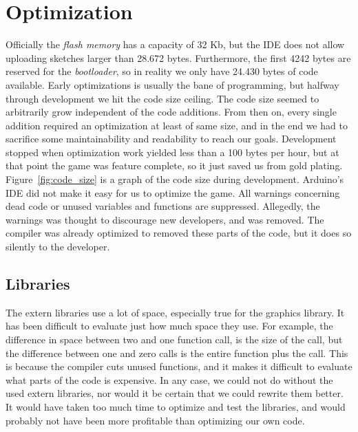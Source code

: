 \section{Optimization} %
Officially the \emph{flash memory} has a capacity of 32 Kb, but the IDE does not allow uploading sketches larger than 28.672 bytes. Furthermore, the first 4242 bytes are reserved for the \emph{bootloader}, so in reality we only have 24.430 bytes of code available. %
\newline
Early optimizations is usually the bane of programming, but halfway through development we hit the code size ceiling. The code size seemed to arbitrarily grow independent of the code additions. From then on, every single addition required an optimization at least of same size, and in the end we had to sacrifice some maintainability and readability to reach our goals. Development stopped when optimization work yielded less than a 100 bytes per hour, but at that point the game was feature complete, so it just saved us from gold plating. Figure~\ref{fig:code_size} is a graph of the code size during development.
\newline
Arduino's IDE did not make it easy for us to optimize the game. All warnings concerning dead code or unused variables and functions are suppressed. Allegedly, the warnings was thought to discourage new developers, and was removed. The compiler was already optimized to removed these parts of the code, but it does so silently to the developer.

\subsection{Libraries} %
The extern libraries use a lot of space, especially true for the graphics library. It has been difficult to evaluate just how much space they use. For example, the difference in space between two and one function call, is the size of the call, but the difference between one and zero calls is the entire function plus the call. This is because the compiler cuts unused functions, and it makes it difficult to evaluate what parts of the code is expensive.
\newline
In any case, we could not do without the used extern libraries, nor would it be certain that we could rewrite them better. It would have taken too much time to optimize and test the libraries, and would probably not have been more profitable than optimizing our own code.

